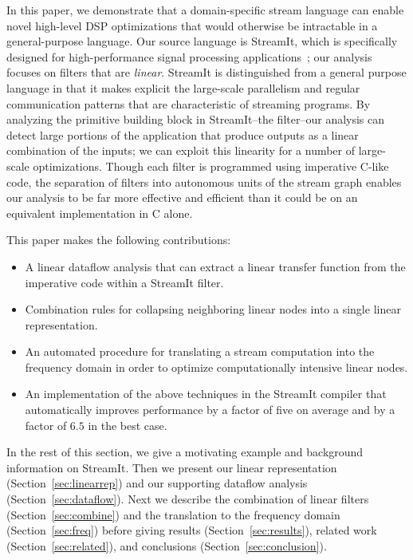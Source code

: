 In this paper, we demonstrate that a domain-specific stream language
can enable novel high-level DSP optimizations that would otherwise be
intractable in a general-purpose language.  Our source language is
StreamIt, which is specifically designed for high-performance signal
processing applications~\cite{streamit-asplos,streamitcc}; our
analysis focuses on filters that are {\it linear}.  StreamIt is
distinguished from a general purpose language in that it makes
explicit the large-scale parallelism and regular communication
patterns that are characteristic of streaming programs.  By analyzing
the primitive building block in StreamIt--the filter--our analysis can
detect large portions of the application that produce outputs as a
linear combination of the inputs; we can exploit this linearity
for a number of large-scale optimizations.  Though each filter is
programmed using imperative C-like code, the separation of filters
into autonomous units of the stream graph enables our analysis to be
far more effective and efficient than it could be on an equivalent
implementation in C alone.

This paper makes the following contributions:
\begin{itemize}

\item A linear dataflow analysis that can extract a linear transfer
function from the imperative code within a StreamIt filter.
\vspace{-6pt}

\item Combination rules for collapsing neighboring linear nodes into a
single linear representation.
\vspace{-6pt}

\item An automated procedure for translating a stream computation into
the frequency domain in order to optimize computationally intensive
linear nodes.
\vspace{-6pt}

\item An implementation of the above techniques in the StreamIt
compiler that automatically improves performance by a factor of
five on average and by a factor of $6.5$ in the best case.

\end{itemize}

In the rest of this section, we give a motivating example and
background information on StreamIt.  Then we present our linear
representation (Section~\ref{sec:linearrep}) and our 
supporting dataflow analysis (Section~\ref{sec:dataflow}).  
Next we describe the
combination of linear filters (Section~\ref{sec:combine}) and the
translation to the frequency domain (Section~\ref{sec:freq}) before
giving results (Section~\ref{sec:results}), related work
(Section~\ref{sec:related}), and conclusions
(Section~\ref{sec:conclusion}).

